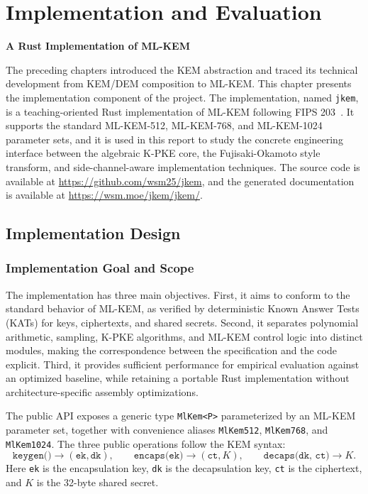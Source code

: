 \chapter{Implementation and Evaluation}
\begin{center}
\large \textbf{A Rust Implementation of ML-KEM}
\end{center}
\vspace{1em}

The preceding chapters introduced the KEM abstraction and traced its technical development from KEM/DEM composition to ML-KEM. This chapter presents the implementation component of the project. The implementation, named \texttt{jkem}, is a teaching-oriented Rust implementation of ML-KEM following FIPS 203~\cite{nist2024fips203}. It supports the standard ML-KEM-512, ML-KEM-768, and ML-KEM-1024 parameter sets, and it is used in this report to study the concrete engineering interface between the algebraic K-PKE core, the Fujisaki-Okamoto style transform, and side-channel-aware implementation techniques. The source code is available at \url{https://github.com/wsm25/jkem}, and the generated documentation is available at \url{https://wsm.moe/jkem/jkem/}.

\section{Implementation Design}

\subsection{Implementation Goal and Scope}

The implementation has three main objectives. First, it aims to conform to the standard behavior of ML-KEM, as verified by deterministic Known Answer Tests (KATs) for keys, ciphertexts, and shared secrets. Second, it separates polynomial arithmetic, sampling, K-PKE algorithms, and ML-KEM control logic into distinct modules, making the correspondence between the specification and the code explicit. Third, it provides sufficient performance for empirical evaluation against an optimized baseline, while retaining a portable Rust implementation without architecture-specific assembly optimizations.

The public API exposes a generic type \texttt{MlKem<P>} parameterized by an ML-KEM parameter set, together with convenience aliases \texttt{MlKem512}, \texttt{MlKem768}, and \texttt{MlKem1024}. The three public operations follow the KEM syntax:
$$
\texttt{keygen()} \to (\texttt{ek}, \texttt{dk}), \qquad
\texttt{encaps(ek)} \to (\texttt{ct}, K), \qquad
\texttt{decaps(dk, ct)} \to K .
$$
Here \texttt{ek} is the encapsulation key, \texttt{dk} is the decapsulation key, \texttt{ct} is the ciphertext, and $K$ is the 32-byte shared secret.


